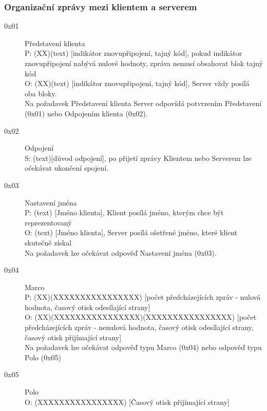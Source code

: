 \documentclass[12pt,a4paper]{article}
\begin{document}
\subsubsection*{Organizační zprávy mezi klientem a serverem}
\begin{description}
\item[0x01] Představení klienta \\
P: (XX)(text) [indikátor znovupřipojení, tajný kód], pokud indikátor znovupřipojení nabývá nulové hodnoty, zpráva nemusí obsahovat blok tajný kód \\
O: (XX)(text) [indikátor znovupřipojení, tajný kód], Server vždy posílá oba bloky. \\
Na požadavek Představení klienta Server odpovídá potvrzením Představení (0x01) nebo Odpojením klienta (0x02).
\item[0x02] Odpojení\\
S: (text)[důvod odpojení], po přijetí zprávy Klientem nebo Serverem lze očekávat ukončení spojení.
\item[0x03] Nastavení jména \\
P: (text) [Jméno klienta], Klient posílá jméno, kterým chce být reprezentovaný \\
O: (text) [Jméno klienta], Server posílá ošetřené jméno, které klient skutečně získal \\
Na požadavek lze očekávat odpověď Nastavení jména (0x03).

\item[0x04] Marco \\ 
P: (XX)(XXXXXXXXXXXXXXXX) [počet předcházejících zpráv - nulová hodnota, časový otisk odesílající strany] \\
O: (XX)(XXXXXXXXXXXXXXXX)(XXXXXXXXXXXXXXXX) [počet předcházejících zpráv - nenulová hodnota, časový otisk odesílající strany, časový otisk přijímající strany] \\
Na požadavek lze očekávat odpověď typu Marco (0x04) nebo odpověď typu Polo (0x05)
\item[0x05] Polo\\
O: (XXXXXXXXXXXXXXXX) [Časový otisk přijímající strany]
\end{description}
\end{document}
